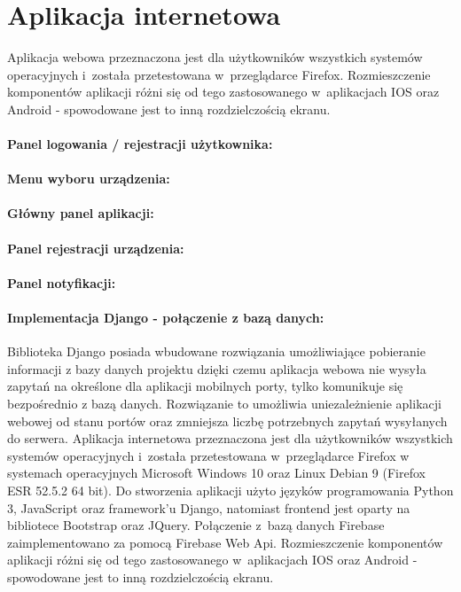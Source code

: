 \section{Aplikacja internetowa}
Aplikacja webowa przeznaczona jest dla użytkowników wszystkich systemów operacyjnych i~została przetestowana w~przeglądarce Firefox. Rozmieszczenie komponentów aplikacji różni się od tego zastosowanego w~aplikacjach IOS oraz Android - spowodowane jest to inną rozdzielczością ekranu. 

\paragraph{Panel logowania / rejestracji użytkownika:}
\paragraph{Menu wyboru urządzenia:}
\paragraph{Główny panel aplikacji:}
\paragraph{Panel rejestracji urządzenia:}
\paragraph{Panel notyfikacji:}


\paragraph{Implementacja Django - połączenie z bazą danych:}
Biblioteka Django posiada wbudowane rozwiązania umożliwiające pobieranie informacji z bazy danych projektu dzięki czemu aplikacja webowa nie wysyła zapytań na określone dla aplikacji mobilnych porty, tylko komunikuje się bezpośrednio z bazą danych. Rozwiązanie to umożliwia uniezależnienie aplikacji webowej od stanu portów oraz zmniejsza liczbę potrzebnych zapytań wysyłanych do serwera.
Aplikacja internetowa przeznaczona jest dla użytkowników wszystkich systemów operacyjnych i~została przetestowana w~przeglądarce Firefox w systemach operacyjnych Microsoft Windows 10 oraz Linux Debian 9 (Firefox ESR 52.5.2 64 bit). Do stworzenia aplikacji użyto języków programowania Python 3, JavaScript oraz framework'u Django, natomiast frontend jest oparty na bibliotece Bootstrap oraz JQuery. Połączenie z~bazą danych Firebase zaimplementowano za pomocą Firebase Web Api. Rozmieszczenie komponentów aplikacji różni się od tego zastosowanego w~aplikacjach IOS oraz Android - spowodowane jest to inną rozdzielczością ekranu. 

